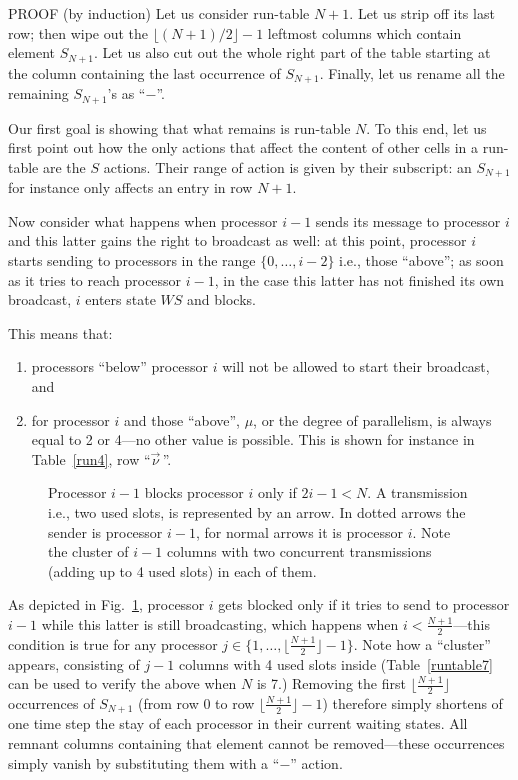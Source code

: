 \documentclass{elsart}
\newcommand{\floor}[1]{{\lfloor{#1}\rfloor}}
\begin{document}
\begin{pf*}{PROOF (by induction)}
Let us consider run-table $N+1$. Let us strip off its last row; 
then wipe out 
the $\floor{(N+1)/2}-1$ leftmost columns which contain element $S_{N+1}$. 
Let us also cut out the whole right part of the table starting
at the column containing the last occurrence of $S_{N+1}$. Finally, let us rename all
the remaining $S_{N+1}$'s as ``$-$''.

Our first goal is showing that what remains is run-table $N$.
To this end, let us first point out how
the only actions that affect the content of other cells in a run-table
are the $S$ actions. Their range of action is given by their subscript:
an $S_{N+1}$ for instance only affects an entry in row $N+1$.

Now consider what happens when processor $i-1$ sends its message to 
processor $i$ and this latter gains the right to broadcast as well:
at this point, processor $i$ starts sending to processors in the
range $\{0,\dots,i-2\}$ i.e., those ``above''; as soon as it
tries to reach processor $i-1$, in the case this latter has not
finished its own broadcast, $i$ enters state $W\!S$ and blocks.

This means that:
\begin{enumerate}
\item processors ``below'' processor $i$ will not be allowed
to start their broadcast, and
\item for processor $i$ and those ``above'', $\mu$, or the degree of parallelism,
is always equal to 2 or 4---no other value is possible.
This is shown for instance in Table~\ref{run4}, row ``$\vec\nu\,$''.
\end{enumerate}

\begin{figure}[h]
\centerline{}
\caption{Processor $i-1$ blocks processor $i$ only if $2i-1<N$. 
A transmission i.e.,  two used slots, is represented by an arrow.
In dotted arrows the sender is processor $i-1$, for normal arrows
it is processor $i$.
Note the cluster of $i-1$ columns with two concurrent transmissions
(adding up to 4 used slots) in each of them.}
\label{f-prop1}
\end{figure}

As depicted in Fig.~\ref{f-prop1}, processor $i$ gets blocked
only if it tries to send to processor $i-1$ while this latter
is still broadcasting, which happens
when $i<\frac{N+1}{2}$---this condition is true for any
processor $j\in\{1,\dots, \floor{\frac{N+1}{2}}-1\}$. Note how
a ``cluster'' appears, consisting of $j-1$ columns with 4 used slots inside
(Table~\ref{runtable7} can be used to verify the above when $N$ is 7.)
Removing the first $\floor{\frac{N+1}{2}}$ occurrences
of $S_{N+1}$ (from row 0 to row $\floor{\frac{N+1}{2}}-1$)
therefore simply shortens of one time step the stay
of each processor in their current waiting states.
All remnant columns containing that element cannot be removed---these
occurrences simply vanish by substituting them with a ``$-$'' action.


\end{pf*}
\end{document}
